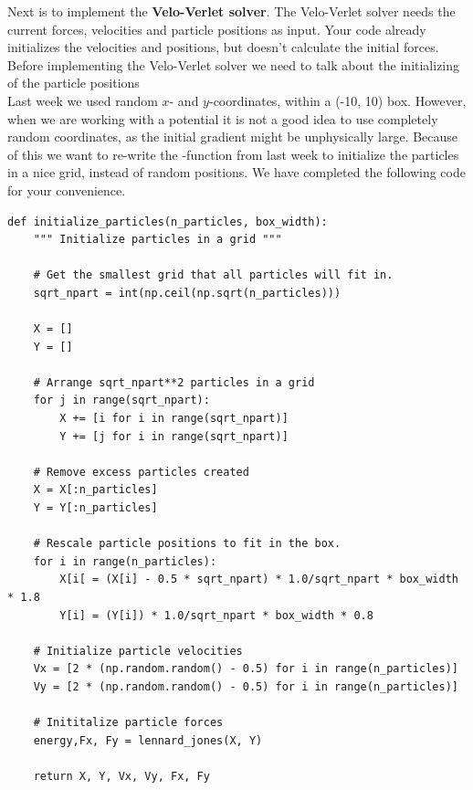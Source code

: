 \documentclass{article}
\begin{document}
\vspace{10pt}

Next is to implement the {\bf Velo-Verlet solver}.
The Velo-Verlet solver needs the current forces, velocities and particle positions as input.
Your code already initializes the velocities and positions, but doesn't calculate the initial forces. Before implementing the Velo-Verlet solver we need to talk about the initializing of the particle positions \\

Last week we used random $x$- and $y$-coordinates, within a (-10, 10) box.
However, when we are working with a potential it is not a good idea to use completely random coordinates, as the initial gradient might be unphysically large.
Because of this we want to re-write the -function from last week to initialize the particles in a nice grid, instead of random positions.
We have completed the following code for your convenience.

\begin{lstlisting}
def initialize_particles(n_particles, box_width):
    """ Initialize particles in a grid """
    
    # Get the smallest grid that all particles will fit in.
    sqrt_npart = int(np.ceil(np.sqrt(n_particles)))

    X = []
    Y = []

    # Arrange sqrt_npart**2 particles in a grid
    for j in range(sqrt_npart):
        X += [i for i in range(sqrt_npart)]
        Y += [j for i in range(sqrt_npart)]

    # Remove excess particles created
    X = X[:n_particles]
    Y = Y[:n_particles]

    # Rescale particle positions to fit in the box.
    for i in range(n_particles):
        X[i[ = (X[i] - 0.5 * sqrt_npart) * 1.0/sqrt_npart * box_width * 1.8
        Y[i] = (Y[i]) * 1.0/sqrt_npart * box_width * 0.8

    # Initialize particle velocities
    Vx = [2 * (np.random.random() - 0.5) for i in range(n_particles)]
    Vy = [2 * (np.random.random() - 0.5) for i in range(n_particles)]

    # Inititalize particle forces
    energy,Fx, Fy = lennard_jones(X, Y)

    return X, Y, Vx, Vy, Fx, Fy

\end{lstlisting}
\end{document}
